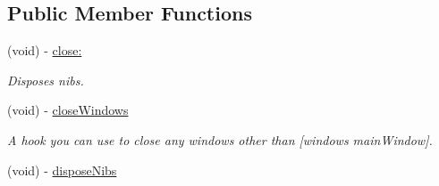 \subsection*{Public Member Functions}
\begin{DoxyCompactItemize}
\item 
\hypertarget{interface_g_d_external_nib_controller_a6003f538a059b050deef0dd471f5d418}{
(void) -\/ \hyperlink{interface_g_d_external_nib_controller_a6003f538a059b050deef0dd471f5d418}{close:}}
\label{interface_g_d_external_nib_controller_a6003f538a059b050deef0dd471f5d418}

\begin{DoxyCompactList}\small\item\em Disposes nibs. \item\end{DoxyCompactList}\item 
\hypertarget{interface_g_d_external_nib_controller_a44ea451af6038aeec7642d6d010eefb0}{
(void) -\/ \hyperlink{interface_g_d_external_nib_controller_a44ea451af6038aeec7642d6d010eefb0}{closeWindows}}
\label{interface_g_d_external_nib_controller_a44ea451af6038aeec7642d6d010eefb0}

\begin{DoxyCompactList}\small\item\em A hook you can use to close any windows other than \mbox{[}windows mainWindow\mbox{]}. \item\end{DoxyCompactList}\item 
\hypertarget{interface_g_d_external_nib_controller_a660d18349789a52e303e4460e80999bf}{
(void) -\/ \hyperlink{interface_g_d_external_nib_controller_a660d18349789a52e303e4460e80999bf}{disposeNibs}}
\label{interface_g_d_external_nib_controller_a660d18349789a52e303e4460e80999bf}


\end{DoxyCompactItemize}
